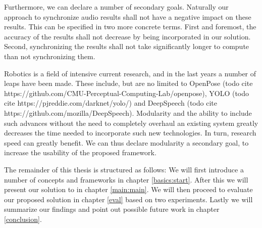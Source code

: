 Furthermore, we can declare a number of secondary goals.
Naturally our approach to synchronize audio results shall not have a negative impact on these results.
This can be specified in two more concrete terms.
First and foremost, the accuracy of the results shall not decrease by being incorporated in our solution.
Second, synchronizing the results shall not take significantly longer to compute than not synchronizing them.


Robotics is a field of intensive current research, and in the last years a number of leaps have been made.
These include, but are no limited to OpenPose (todo cite https://github.com/CMU-Perceptual-Computing-Lab/openpose), YOLO (todo cite https://pjreddie.com/darknet/yolo/) and DeepSpeech (todo cite https://github.com/mozilla/DeepSpeech).
Modularity and the ability to include such advances without the need to completely overhaul an existing system greatly decreases the time needed to incorporate such new technologies.
In turn, research speed can greatly benefit.
We can thus declare modularity a secondary goal, to increase the usability of the proposed framework.


The remainder of this thesis is structured as follows:
We will first introduce a number of concepts and frameworks in chapter \ref{basics:start}.
After this we will present our solution to 
in chapter \ref{main:main}.
We will then proceed to evaluate our proposed solution in chapter \ref{eval} based on two experiments.
Lastly we will summarize our findings and point out possible future work in chapter \ref{conclusion}.


